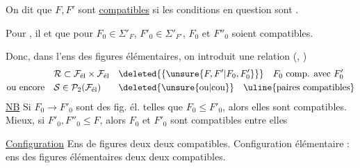 On dit que $F,F'$ sont \uline{compatibles} si les conditions en question sont .

Pour , il  et  que pour  $F_0\in\Sigma'_F$, $F'_0\in\Sigma'_{F'}$, $F_0$ et $F''_0$ soient compatibles.

Donc, dans l'ens  des figures élémentaires, on introduit une relation (, )
\[
\begin{aligned}
&\mathcal{R}\subset\mathcal{F}_{\text{él}}\times\mathcal{F}_{\text{él}}&&\deleted{\{\unsure{F,F'|F_0,F'_0}\}}\quad \text{$F_0$ comp. avec $F'_0$}\\
\text{ou encore}\quad&\mathcal{S}\in\mathcal{P}_2(\mathcal{F}_{\text{él}})&&\deleted{\text{\unsure{ou|cou}}}\quad\text{\uline{paires compatibles}}
\end{aligned}
\]
\uline{NB} Si  $F_0\to F'_0$ sont des fig. él. telles que $F_0\le F'_0$, alors elles sont compatibles. Mieux, si $F'_0,F''_0\le F$, alors $F_0$ et $F'_0$ sont compatibles entre elles

\uline{Configuration} Ens de figures deux  deux compatibles. Configuration élémentaire : ens des figures élémentaires deux  deux compatibles.
